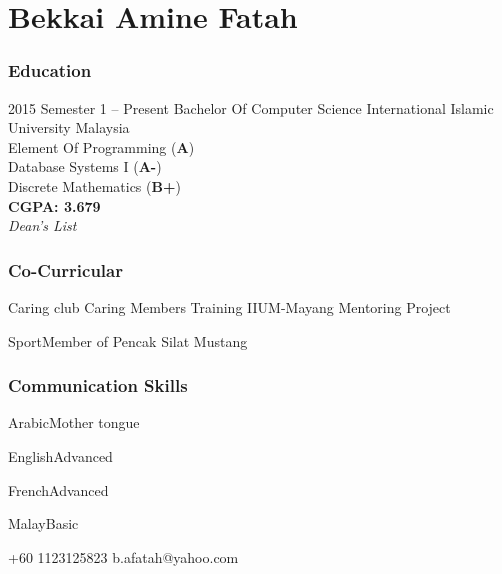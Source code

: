 \documentclass[12pt]{tccv}
\begin{document}
  
\part{Bekkai Amine Fatah}

\section{Education}

\begin{eventlist}

\item{2015 Semester 1 -- Present}
     {Bachelor Of Computer Science}
     {\normalsize{International Islamic University Malaysia}}\\
     \small {Element Of Programming (\textbf{A})}\\
     \small{Database Systems I (\textbf{A-})}\\
     \small{Discrete Mathematics (\textbf{B+})}\\
     \textbf{CGPA: 3.679}\\
     \textit{Dean's List}
\end{eventlist}




\section{Co-Curricular}

\begin{factlist}
	\item{Caring club}
	{Caring Members Training\vspace{2mm}
	 IIUM-Mayang Mentoring Project}
	
	\item{Sport}{Member of Pencak Silat Mustang}
\end{factlist}


\section{Communication Skills}

\begin{factlist}
	\item{Arabic}{Mother tongue}
	\item{English}{Advanced}
	\item{French}{Advanced}
	\item{Malay}{Basic}
\end{factlist}


{+60 1123125823}
{b.afatah@yahoo.com}
\end{document}
